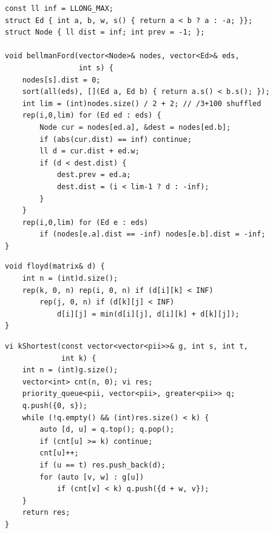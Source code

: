 \begin{lstlisting}
const ll inf = LLONG_MAX;
struct Ed { int a, b, w, s() { return a < b ? a : -a; }};
struct Node { ll dist = inf; int prev = -1; };

void bellmanFord(vector<Node>& nodes, vector<Ed>& eds,
                 int s) {
    nodes[s].dist = 0;
    sort(all(eds), [](Ed a, Ed b) { return a.s() < b.s(); });
    int lim = (int)nodes.size() / 2 + 2; // /3+100 shuffled
    rep(i,0,lim) for (Ed ed : eds) {
        Node cur = nodes[ed.a], &dest = nodes[ed.b];
        if (abs(cur.dist) == inf) continue;
        ll d = cur.dist + ed.w;
        if (d < dest.dist) {
            dest.prev = ed.a;
            dest.dist = (i < lim-1 ? d : -inf);
        }
    }
    rep(i,0,lim) for (Ed e : eds)
        if (nodes[e.a].dist == -inf) nodes[e.b].dist = -inf;
}
\end{lstlisting}


\begin{lstlisting}
void floyd(matrix& d) {
    int n = (int)d.size();
    rep(k, 0, n) rep(i, 0, n) if (d[i][k] < INF)
        rep(j, 0, n) if (d[k][j] < INF)
            d[i][j] = min(d[i][j], d[i][k] + d[k][j]);
}
\end{lstlisting}


\begin{lstlisting}
vi kShortest(const vector<vector<pii>>& g, int s, int t,
             int k) {
    int n = (int)g.size();
    vector<int> cnt(n, 0); vi res;
    priority_queue<pii, vector<pii>, greater<pii>> q;
    q.push({0, s});
    while (!q.empty() && (int)res.size() < k) {
        auto [d, u] = q.top(); q.pop();
        if (cnt[u] >= k) continue;
        cnt[u]++;
        if (u == t) res.push_back(d);
        for (auto [v, w] : g[u])
            if (cnt[v] < k) q.push({d + w, v});
    }
    return res;
}
\end{lstlisting}
